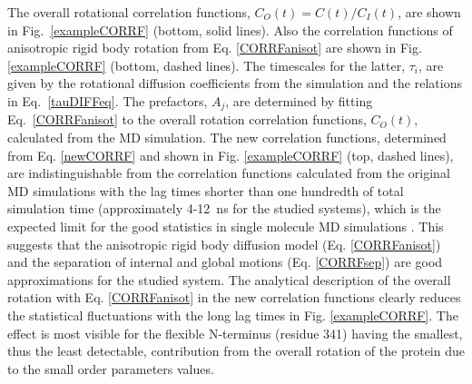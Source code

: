 \documentclass[journal=jpcbfk,manuscript=article]{achemso}
\begin{document}
The overall rotational correlation functions, $C_O(t)=C(t)/C_I(t)$,
are shown in Fig.~\ref{exampleCORRF} (bottom, solid lines).
Also the correlation functions of anisotropic rigid body rotation
from Eq. \ref{CORRFanisot} are shown in Fig. \ref{exampleCORRF} (bottom, dashed lines).
The timescales for the latter, $\tau_i$, are given by the rotational
diffusion coefficients from the simulation and the relations
in Eq.~\ref{tauDIFFeq}. The prefactors, $A_j$, are determined by fitting
Eq.~\ref{CORRFanisot} to the overall rotation correlation functions, $C_O(t)$, calculated from the MD simulation.
The new correlation functions, determined from Eq. \ref{newCORRF} and
shown in Fig. \ref{exampleCORRF} (top, dashed lines),
are indistinguishable from the correlation functions calculated from
the original MD simulations with the lag times shorter than one
hundredth of total simulation time (approximately 4-12~ns for the studied systems),
which is the expected limit for the good statistics in single molecule MD simulations \cite{lu06}.
This suggests that the anisotropic rigid body diffusion model (Eq. \ref{CORRFanisot}) and
the separation of internal and global motions (Eq. \ref{CORRFsep}) are
good approximations for the studied system.
The analytical description of the overall rotation with Eq. \ref{CORRFanisot}
in the new correlation functions
clearly reduces the statistical fluctuations with the long lag times in Fig. \ref{exampleCORRF}.
The effect is most visible for the flexible N-terminus (residue 341) having
the smallest, thus the least detectable, contribution from the
overall rotation of the protein due to the small order parameters values.
\end{document}
